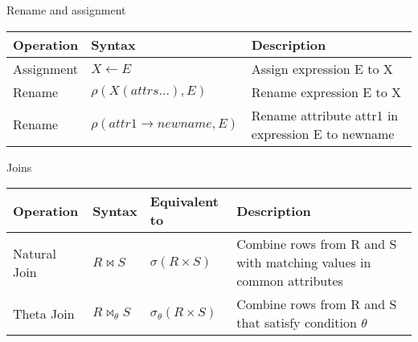\begin{theorem}
    {Rename and assignment}
    \begin{tabular}{l|l|l}
        Operation  & Syntax                       & Description                                       \\
        \hline
        Assignment & $X \gets E$                  & Assign expression E to X                          \\
        Rename     & $\rho(X(attrs...), E)$       & Rename expression E to X                          \\
        Rename     & $\rho(attr1 \to newname, E)$ & Rename attribute attr1 in expression E to newname \\
    \end{tabular}
\end{theorem}

\begin{theorem}
    {Joins}
    \begin{tabular}{l|l|l|p{8cm}}
        Operation    & Syntax                 & Equivalent to                & Description                                                         \\
        \hline
        Natural Join & $R \bowtie S$          & $\sigma(R\times S)$          & Combine rows from R and S with matching values in common attributes \\
        Theta Join   & $R \bowtie_{\theta} S$ & $\sigma_{\theta}(R\times S)$ & Combine rows from R and S that satisfy condition $\theta$           \\
    \end{tabular}
\end{theorem}
